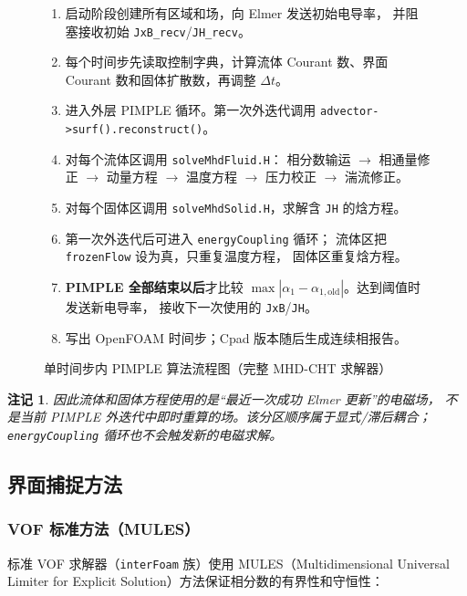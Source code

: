 \documentclass[11pt,a4paper]{article}
\newtheorem{remark}{注记}[section]
\begin{document}
\begin{figure}[H]
\centering
\caption{单时间步内 PIMPLE 算法流程图（完整 MHD-CHT 求解器）}
\begin{minipage}{0.95\textwidth}
\begin{enumerate}
    \item 启动阶段创建所有区域和场，向 Elmer 发送初始电导率，
    并阻塞接收初始 \texttt{JxB\_recv}/\texttt{JH\_recv}。
    \item 每个时间步先读取控制字典，计算流体 Courant 数、界面
    Courant 数和固体扩散数，再调整 $\Delta t$。
    \item 进入外层 PIMPLE 循环。第一次外迭代调用
    \texttt{advector->surf().reconstruct()}。
    \item 对每个流体区调用 \texttt{solveMhdFluid.H}：
    相分数输运 $\rightarrow$ 相通量修正 $\rightarrow$ 动量方程
    $\rightarrow$ 温度方程 $\rightarrow$ 压力校正
    $\rightarrow$ 湍流修正。
    \item 对每个固体区调用 \texttt{solveMhdSolid.H}，求解含
    \texttt{JH} 的焓方程。
    \item 第一次外迭代后可进入 \texttt{energyCoupling} 循环；
    流体区把 \texttt{frozenFlow} 设为真，只重复温度方程，
    固体区重复焓方程。
    \item \textbf{PIMPLE 全部结束以后}才比较
    $\max|\alpha_1-\alpha_{1,\mathrm{old}}|$。达到阈值时发送新电导率，
    接收下一次使用的 \texttt{JxB}/\texttt{JH}。
    \item 写出 OpenFOAM 时间步；Cpad 版本随后生成连续相报告。
\end{enumerate}
\end{minipage}
\end{figure}

\begin{remark}
因此流体和固体方程使用的是“最近一次成功 Elmer 更新”的电磁场，
不是当前 PIMPLE 外迭代中即时重算的场。该分区顺序属于显式/滞后耦合；
\texttt{energyCoupling} 循环也不会触发新的电磁求解。
\end{remark}

\subsection{界面捕捉方法}

\subsubsection{VOF 标准方法（MULES）}

标准 VOF 求解器（\texttt{interFoam} 族）使用 MULES（Multidimensional Universal Limiter for Explicit Solution）方法保证相分数的有界性和守恒性：
\end{document}
